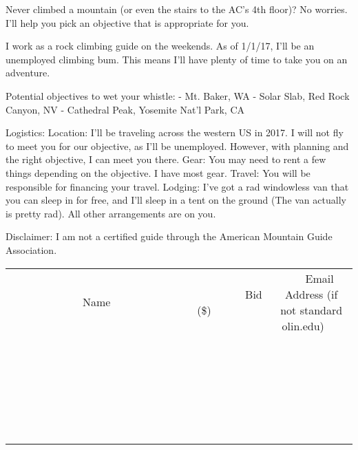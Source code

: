 \documentclass[11pt]{article}
\begin{document}
Never climbed a mountain (or even the stairs to the AC's 4th floor)? No worries. I'll help you pick an objective that is appropriate for you.

I work as a rock climbing guide on the weekends. As of 1/1/17, I'll be an unemployed climbing bum. This means I'll have plenty of time to take you on an adventure.

Potential objectives to wet your whistle:
- Mt. Baker, WA
- Solar Slab, Red Rock Canyon, NV
- Cathedral Peak, Yosemite Nat'l Park, CA

Logistics:
Location: I'll be traveling across the western US in 2017. I will not fly to meet you for our objective, as I'll be unemployed. However, with planning and the right objective, I can meet you there.
Gear: You may need to rent a few things depending on the objective. I have most gear.
Travel: You will be responsible for financing your travel.
Lodging: I've got a rad windowless van that you can sleep in for free, and I'll sleep in a tent on the ground (The van actually is pretty rad). All other arrangements are on you.

Disclaimer: I am not a certified guide through the American Mountain Guide Association.
\\[6ex]
\begin{tabular}{c c c}
~~~~~~~~~~~~~Name~~~~~~~~~~~~~ & ~~~~~~~~~Bid (\$)~~~~~~~~~  & ~~~Email Address (if not standard olin.edu)~~~\\
 & & \\
\hline
 & & \\
\hline
 & & \\
\hline
 & & \\
\hline
 & & \\
\hline
 & & \\
\hline
 & & \\
\hline
 & & \\
\hline
 & & \\
\hline
 & & \\
\hline
 & & \\
\hline
 & & \\
\hline
 & & \\
\hline
 & & \\
\hline
 & & \\
\hline
 & & \\
\hline
 & & \\
\hline
 & & \\
\hline
 & & \\
\hline
 & & \\
\hline
 & & \\
\hline
 & & \\
\hline
 & & \\
\hline
 & & \\
\hline
 & & \\
\hline
 & & \\
\hline
\end{tabular}
\newpage
\end{document}
